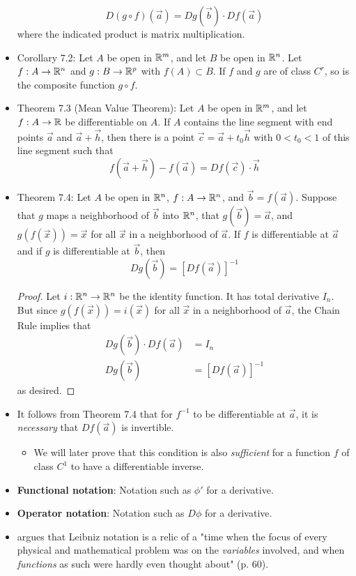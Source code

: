 \documentclass[../notes.tex]{subfiles}
\begin{document}
\begin{itemize}
    \begin{equation*}
        D(g\circ f)(\vec{a}) = Dg(\vec{b})\cdot Df(\vec{a})
    \end{equation*}
    where the indicated product is matrix multiplication.
    \item Corollary 7.2: Let $A$ be open in $\mathbb{R}^m$, and let $B$ be open in $\mathbb{R}^n$. Let $f:A\to\mathbb{R}^n$ and $g:B\to\mathbb{R}^p$ with $f(A)\subset B$. If $f$ and $g$ are of class $C^r$, so is the composite function $g\circ f$.
    \item Theorem 7.3 (Mean Value Theorem): Let $A$ be open in $\mathbb{R}^m$, and let $f:A\to\mathbb{R}$ be differentiable on $A$. If $A$ contains the line segment with end points $\vec{a}$ and $\vec{a}+\vec{h}$, then there is a point $\vec{c}=\vec{a}+t_0\vec{h}$ with $0<t_0<1$ of this line segment such that
    \begin{equation*}
        f(\vec{a}+\vec{h})-f(\vec{a}) = Df(\vec{c})\cdot\vec{h}
    \end{equation*}
    \item Theorem 7.4: Let $A$ be open in $\mathbb{R}^n$, $f:A\to\mathbb{R}^n$, and $\vec{b}=f(\vec{a})$. Suppose that $g$ maps a neighborhood of $\vec{b}$ into $\mathbb{R}^n$, that $g(\vec{b})=\vec{a}$, and $g(f(\vec{x}))=\vec{x}$ for all $\vec{x}$ in a neighborhood of $\vec{a}$. If $f$ is differentiable at $\vec{a}$ and if $g$ is differentiable at $\vec{b}$, then
    \begin{equation*}
        Dg(\vec{b}) = [Df(\vec{a})]^{-1}
    \end{equation*}
    \begin{proof}
        Let $i:\mathbb{R}^n\to\mathbb{R}^n$ be the identity function. It has total derivative $I_n$. But since $g(f(\vec{x}))=i(\vec{x})$ for all $\vec{x}$ in a neighborhood of $\vec{a}$, the Chain Rule implies that
        \begin{align*}
            Dg(\vec{b})\cdot Df(\vec{a}) &= I_n\\
            Dg(\vec{b}) &= [Df(\vec{a})]^{-1}
        \end{align*}
        as desired.
    \end{proof}
    \item It follows from Theorem 7.4 that for $f^{-1}$ to be differentiable at $\vec{a}$, it is \emph{necessary} that $Df(\vec{a})$ is invertible.
    \begin{itemize}
        \item We will later prove that this condition is also \emph{sufficient} for a function $f$ of class $C^1$ to have a differentiable inverse.
    \end{itemize}
    \item \textbf{Functional notation}: Notation such as $\phi'$ for a derivative.
    \item \textbf{Operator notation}: Notation such as $D\phi$ for a derivative.
    \item \textcite{bib:Munkres} argues that Leibniz notation is a relic of a "time when the focus of every physical and mathematical problem was on the \emph{variables} involved, and when \emph{functions} as such were hardly even thought about" (p. 60).
\end{itemize}
\end{document}
